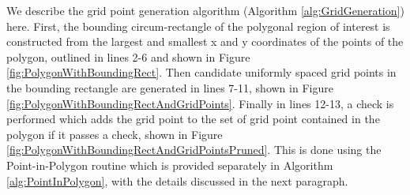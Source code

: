 We describe the grid point generation algorithm (Algorithm \ref{alg:GridGeneration}) here. First, the bounding circum-rectangle of the polygonal region of interest is constructed from the largest and smallest x and y coordinates of the points of the polygon, outlined in lines 2-6 and shown in Figure \ref{fig:PolygonWithBoundingRect}. Then candidate uniformly spaced grid points in the bounding rectangle are generated in lines 7-11, shown in Figure \ref{fig:PolygonWithBoundingRectAndGridPoints}. Finally in lines 12-13, a check is performed which adds the grid point to the set of grid point contained in the polygon if it passes a check, shown in Figure \ref{fig:PolygonWithBoundingRectAndGridPointsPruned}. This is done using the Point-in-Polygon routine which is provided separately in Algorithm \ref{alg:PointInPolygon}, with the details discussed in the next paragraph.







